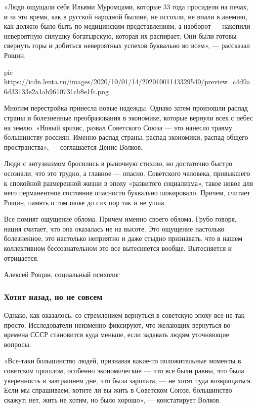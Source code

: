«Люди ощущали себя Ильями Муромцами, которые 33 года просидели на печах, и за
это время, как в русской народной былине, не иссохли, не впали в анемию, как
должно было быть по медицинским представлениям, а наоборот --- накопили
невероятную силушку богатырскую, которая их распирает. Они были готовы свернуть
горы и добиться невероятных успехов буквально во всем», --- рассказал Рощин.

\ifcmt
pic https://icdn.lenta.ru/images/2020/10/01/14/20201001143329540/preview_c4d9a6d33133e2a1ab9610731cb8e1fc.png
\fi

Многим перестройка принесла новые надежды. Однако затем произошли распад страны
и болезненные преобразования в экономике, которые вернули всех с небес на
землю. «Новый кризис, развал Советского Союза --- это нанесло травму большинству
россиян. Именно распад страны, распад экономики, распад общего пространства», —
соглашается Денис Волков.

Люди с энтузиазмом бросились в рыночную стихию, но достаточно быстро осознали,
что это трудно, а главное --- опасно. Советского человека, привыкшего к спокойной
размеренной жизни в эпоху «развитого социализма», такое новое для него
перманентное состояние опасности буквально шокировало. Причем, считает Рощин,
память о том шоке до сих пор так и не ушла.

Все помнят ощущение облома. Причем именно своего облома. Грубо говоря, нация
считает, что она оказалась не на высоте. Это ощущение настолько болезненное,
это настолько неприятно и даже стыдно признавать, что в нашем коллективном
бессознательном это все вытесняется вообще. Вытесняется и отрицается.

Алексей Рощин, социальный психолог

\subsubsection{Хотят назад, но не совсем}

Однако, как оказалось, со стремлением вернуться в советскую эпоху все не так
просто. Исследователи неизменно фиксируют, что желающих вернуться во времена
СССР становится куда меньше, если задавать людям уточняющие вопросы.

«Все-таки большинство людей, признавая какие-то положительные моменты в
советском прошлом, особенно экономические --- что все были равны, что была
уверенность в завтрашнем дне, что была зарплата, --- не хотят туда возвращаться.
Если мы спрашиваем, хотите ли вы жить в Советском Союзе, большинство скажут:
нет, жить не хотим, но было хорошо», --- констатирует Волков.

